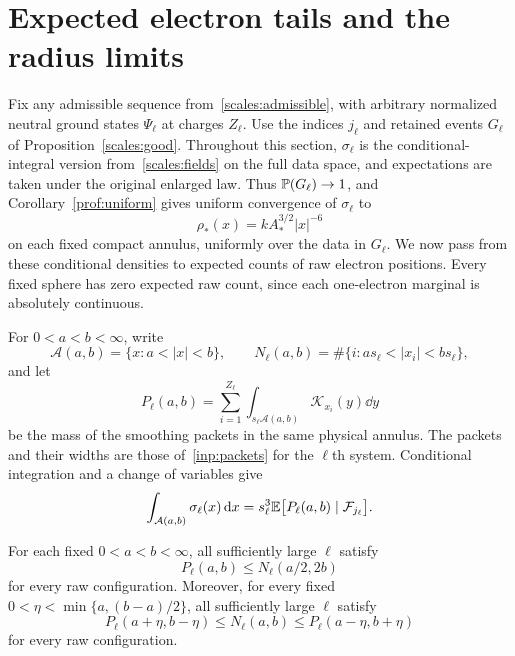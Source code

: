 \section{Expected electron tails and the radius limits}\label{sec:tails}

Fix any admissible sequence from~\eqref{scales:admissible}, with
arbitrary normalized neutral ground states $\Psi_\ell$ at charges
$Z_\ell$. Use the indices $j_\ell$ and retained events $G_\ell$ of
Proposition~\ref{scales:good}.
Throughout this section, $\sigma_\ell$ is the conditional-integral
version from~\eqref{scales:fields} on the full data space, and
expectations are taken under the original enlarged law.
Thus $\mathbb P(G_\ell)\to1$, and
Corollary~\ref{prof:uniform} gives uniform convergence of
$\sigma_\ell$ to
\[
 \rho_*(x)=kA_*^{3/2}|x|^{-6}
\]
on each fixed compact annulus, uniformly over the data in $G_\ell$.
We now pass from these conditional densities to expected counts of
raw electron positions. Every fixed sphere has zero expected raw
count, since each one-electron marginal is absolutely continuous.

For $0<a<b<\infty$, write
\[
 \mathcal A(a,b)=\{x:a<|x|<b\},\qquad
 N_\ell(a,b)=\#\{i:a s_\ell<|x_i|<b s_\ell\},
\]
and let
\[
 P_\ell(a,b)=\sum_{i=1}^{Z_\ell}
       \int_{s_\ell\mathcal A(a,b)}\mathcal K_{x_i}(y)\dd y
\]
be the mass of the smoothing packets in the same physical annulus.
The packets and their widths are those of~\eqref{inp:packets} for the
$\ell$th system. Conditional integration and a change of variables give
\begin{equation}\label{tail:conditional-mass}
 \int_{\mathcal A(a,b)}\sigma_\ell(x)\,\mathrm d x
   =s_\ell^3\mathbb E\bigl[P_\ell(a,b)\mid\mathcal F_{j_\ell}\bigr].
\end{equation}

\begin{lemma}\label{tail:packets}
For each fixed $0<a<b<\infty$, all sufficiently large $\ell$ satisfy
\begin{equation}\label{tail:localization}
 P_\ell(a,b)\le N_\ell(a/2,2b)
\end{equation}
for every raw configuration. Moreover, for every fixed
$0<\eta<\min\{a,(b-a)/2\}$, all sufficiently large $\ell$ satisfy
\begin{equation}\label{tail:sandwich}
 P_\ell(a+\eta,b-\eta)
    \le N_\ell(a,b)
    \le P_\ell(a-\eta,b+\eta)
\end{equation}
for every raw configuration.
\end{lemma}

